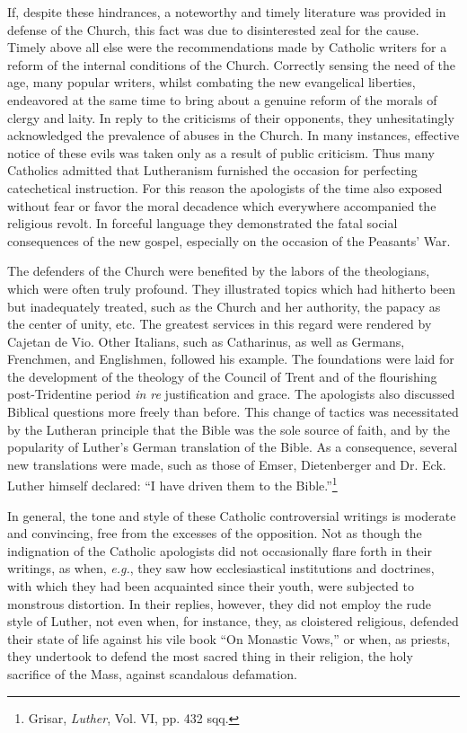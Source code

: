 If, despite these hindrances, a noteworthy and timely literature
was provided in defense of the Church, this fact was due to disinterested
zeal for the cause. Timely above all else were the recommendations made
by Catholic writers for a reform of the internal conditions of the Church.
Correctly sensing the need of the age, many
popular writers, whilst combating the new evangelical liberties, endeavored
at the same time to bring about a genuine reform of the
morals of clergy and laity. In reply to the criticisms of their opponents,
they unhesitatingly acknowledged the prevalence of abuses in
the Church. In many instances, effective notice of these evils was
taken only as a result of public criticism. Thus many Catholics admitted
that Lutheranism furnished the occasion for perfecting catechetical
instruction. For this reason the apologists of the time also exposed without
fear or favor the moral decadence which everywhere
accompanied the religious revolt. In forceful language they demonstrated
the fatal social consequences of the new gospel, especially on
the occasion of the Peasants’ War.

The defenders of the Church were benefited by the labors of the
theologians, which were often truly profound. They illustrated topics
which had hitherto been but inadequately treated, such as the Church
and her authority, the papacy as the center of unity, etc. The greatest
services in this regard were rendered by Cajetan de Vio. Other
Italians, such as Catharinus, as well as Germans, Frenchmen, and
Englishmen, followed his example. The foundations were laid for the
development of the theology of the Council of Trent and of the flourishing
post-Tridentine period \textit{in re} justification and grace. The apologists
also discussed Biblical questions more freely than before. This
change of tactics was necessitated by the Lutheran principle that the
Bible was the sole source of faith, and by the popularity of Luther’s
German translation of the Bible. As a consequence, several new translations
were made, such as those of Emser, Dietenberger and Dr. Eck.
Luther himself declared: “I have driven them to the Bible.”\footnote{Grisar, \textit{Luther}, Vol. VI, pp. 432 sqq.}

In general, the tone and style of these Catholic controversial writings
is moderate and convincing, free from the excesses of the opposition. Not
as though the indignation of the Catholic apologists did not
occasionally flare forth in their writings, as when, \textit{e.g.}, they saw how
ecclesiastical institutions and doctrines, with which they had been
acquainted since their youth, were subjected to monstrous distortion.
In their replies, however, they did not employ the rude style of
Luther, not even when, for instance, they, as cloistered religious, defended
their state of life against his vile book “On Monastic Vows,”
or when, as priests, they undertook to defend the most sacred thing in
their religion, the holy sacrifice of the Mass, against scandalous defamation.

